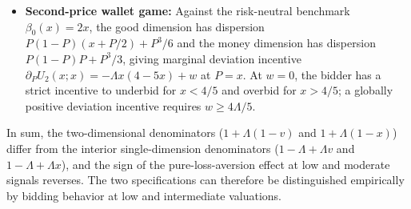 \documentclass[11pt,a4paper]{article}
\theoremstyle{remark}
\begin{document}
\begin{itemize}
\item \textbf{Second-price wallet game:} Against the risk-neutral benchmark
$\beta_0(x)=2x$, the good dimension has dispersion $P(1-P)(x+P/2)+P^3/6$ and the
money dimension has dispersion $P(1-P)P+P^3/3$, giving marginal deviation incentive
$\partial_P U_2(x;x)=-\Lambda x(4-5x)+w$ at $P=x$. At $w=0$, the bidder has a strict
incentive to underbid for $x<4/5$ and overbid for $x>4/5$; a globally positive
deviation incentive requires $w\ge 4\Lambda/5$.
\end{itemize}

In sum, the two-dimensional denominators ($1+\Lambda(1-v)$ and $1+\Lambda(1-x)$)
differ from the interior single-dimension denominators ($1-\Lambda+\Lambda v$ and
$1-\Lambda+\Lambda x$), and the sign of the pure-loss-aversion effect at low and
moderate signals reverses. The two specifications can therefore be distinguished
empirically by bidding behavior at low and intermediate valuations.
\end{document}

